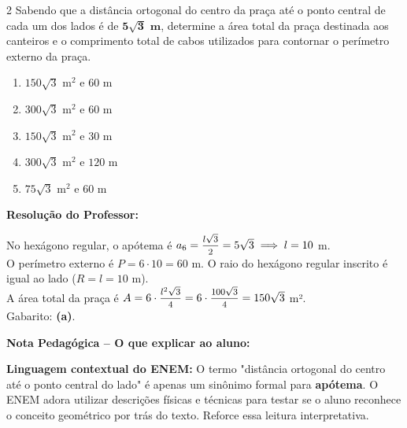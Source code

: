 \begin{multicols*}{2}
Sabendo que a distância ortogonal do centro da praça até o ponto central de cada um dos lados é de $\mathbf{5\sqrt{3}\text{ m}}$, determine a área total da praça destinada aos canteiros e o comprimento total de cabos utilizados para contornar o perímetro externo da praça.

\begin{enumerate}[label=\alph*)]
    \item $150\sqrt{3}\text{ m}^2$ e $60\text{ m}$
    \item $300\sqrt{3}\text{ m}^2$ e $60\text{ m}$
    \item $150\sqrt{3}\text{ m}^2$ e $30\text{ m}$
    \item $300\sqrt{3}\text{ m}^2$ e $120\text{ m}$
    \item $75\sqrt{3}\text{ m}^2$ e $60\text{ m}$
\end{enumerate}

\ifgabarito
    \begin{tcolorbox}[colback=CorTitUm!5, colframe=CorTitUm, boxrule=1pt, arc=4pt, left=6pt, right=6pt, top=6pt, bottom=6pt]
    \small\textbf{\textcolor{CorTitUm}{Resolução do Professor:}}\par\vspace{0.1cm}
    \color{CinzaEscuro}
    No hexágono regular, o apótema é $a_6 = \mfrac{l\sqrt{3}}{2} = 5\sqrt{3} \implies l = 10$ m. 
    \\[0.1cm]
    O perímetro externo é $P = 6 \cdot 10 = 60$ m. O raio do hexágono regular inscrito é igual ao lado ($R = l = 10$ m).
    \\[0.1cm]
    A área total da praça é $A = 6 \cdot \mfrac{l^2\sqrt{3}}{4} = 6 \cdot \mfrac{100\sqrt{3}}{4} = 150\sqrt{3}$ m².
    \\[0.1cm]
    Gabarito: \textbf{(a)}.
    \end{tcolorbox}
    
    \begin{boxpedagogica}
    \textbf{\textcolor{CorVerdeBorda}{Nota Pedagógica -- O que explicar ao aluno:}}\par\vspace{0.1cm}
    \color{CinzaEscuro}
    \textbf{Linguagem contextual do ENEM:} O termo "distância ortogonal do centro até o ponto central do lado" é apenas um sinônimo formal para \textbf{apótema}. O ENEM adora utilizar descrições físicas e técnicas para testar se o aluno reconhece o conceito geométrico por trás do texto. Reforce essa leitura interpretativa.
    \end{boxpedagogica}
\fi


\end{multicols*}
